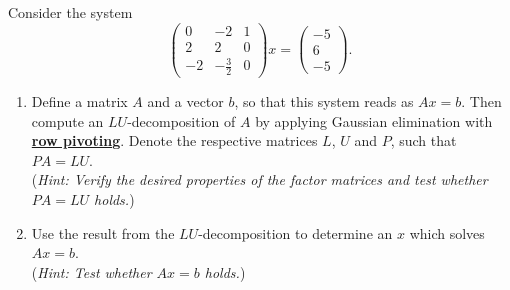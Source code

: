 Consider the system
$$
\begin{pmatrix}
	0	&-2				& 1\\
	2	&2				& 0\\
	-2	&-\frac{3}{2}	&0
\end{pmatrix} x = 
\begin{pmatrix}
-5\\
6\\
-5
\end{pmatrix}.
$$
\begin{enumerate}
	\item  Define a matrix $A$ and a vector $b$, so that this system reads as $Ax = b$. Then compute an $LU$-decomposition of $A$ by applying Gaussian elimination with \underline{\textbf{row pivoting}}. Denote the respective matrices $L$, $U$ and $P$, such that $PA = LU$.\\
	(\textit{Hint: Verify the desired properties of the factor matrices and test whether  $PA = LU$ holds.})
	\item Use the result from the $LU$-decomposition to determine an $x$ which solves $Ax=b$.\\
	(\textit{Hint: Test whether $Ax=b$ holds.})
\end{enumerate}